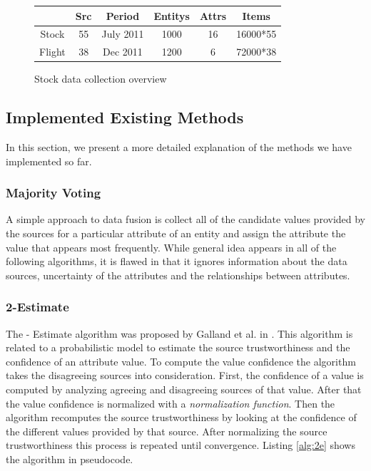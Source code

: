 \documentclass{acm_proc_article-sp}
\begin{document}
\begin{figure}[h]
    \centering
{%
\begin{tabular}{  | c | c | c | c  | c | c |}		
\hline
\textbf{} & \textbf{Src} & \textbf{Period} & \textbf{Entitys} & \textbf{Attrs}  & \textbf{Items}  \\
\hline
 Stock & 55 & July 2011 &  1000 & 16 &  16000*55   \\
 Flight & 38 & Dec 2011 &  1200 & 6 &  72000*38   \\
\hline
\end{tabular}
}
 \caption{Stock data collection overview}%
    \label{fig:stock}%
\end{figure}

\subsection{Implemented Existing Methods}

In this section, we present a more detailed explanation of the methods we have implemented so far. 

\subsubsection{Majority Voting}

A simple approach to data fusion is collect all of the candidate values provided by the sources for a particular attribute of an entity and assign the attribute the value that appears most frequently. While general idea appears in all of the following   algorithms,  it is flawed in that it ignores information about the data sources, uncertainty of the attributes and the relationships between  attributes.



\subsubsection{2-Estimate}
The {- Estimate} algorithm was proposed by Galland et al. in \cite{galland:corro}. This algorithm is related to a probabilistic model to estimate the source trustworthiness and the confidence of an attribute value. To compute the value confidence the algorithm takes the disagreeing sources into consideration. First, the confidence of a value is computed by analyzing agreeing and disagreeing sources of that value. After that the value confidence is normalized with a \emph{normalization function}. Then the algorithm recomputes the source trustworthiness by looking at the confidence of the different values provided by that source. After normalizing the source trustworthiness this process is repeated until convergence. Listing \ref{alg:2e} shows the algorithm in pseudocode.
\end{document}

